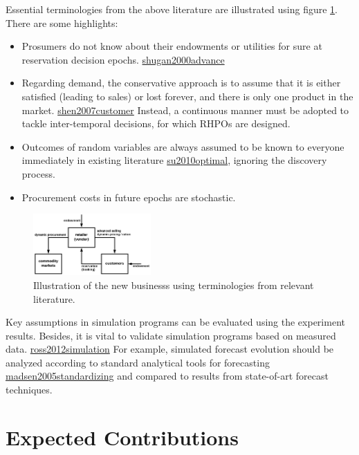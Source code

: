 \documentclass[letterpaper,8pt,twocolumn,twoside,]{pinp}
\providecommand{\tightlist}{%
  \setlength{\itemsep}{0pt}\setlength{\parskip}{0pt}}
\begin{document}
Essential terminologies from the above literature are illustrated using
figure \ref{4}. There are some highlights:

\begin{itemize}
\tightlist
\item
  Prosumers do not know about their endowments or utilities for sure at
  reservation decision epochs.
  \protect\hyperlink{reference}{shugan2000advance}
\item
  Regarding demand, the conservative approach is to assume that it is
  either satisfied (leading to sales) or lost forever, and there is only
  one product in the market.
  \protect\hyperlink{reference}{shen2007customer} Instead, a continuous
  manner must be adopted to tackle inter-temporal decisions, for which
  RHPOs are designed.
\item
  Outcomes of random variables are always assumed to be known to
  everyone immediately in existing literature
  \protect\hyperlink{reference}{su2010optimal}, ignoring the discovery
  process.
\item
  Procurement costs in future epochs are stochastic.
\end{itemize}

\begin{figure}
\begin{center}
  \includegraphics[width=0.40\textwidth]{../../../images/4-12.png}
\end{center}
\caption{Illustration of the new businesss using terminologies from relevant literature.}
\label{4}
\end{figure}

Key assumptions in simulation programs can be evaluated using the
experiment results. Besides, it is vital to validate simulation programs
based on measured data.
\protect\hyperlink{reference}{ross2012simulation} For example, simulated
forecast evolution should be analyzed according to standard analytical
tools for forecasting
\protect\hyperlink{reference}{madsen2005standardizing} and compared to
results from state-of-art forecast techniques.

\hypertarget{expected-contributions}{%
\section{Expected Contributions}\label{expected-contributions}}
\end{document}
